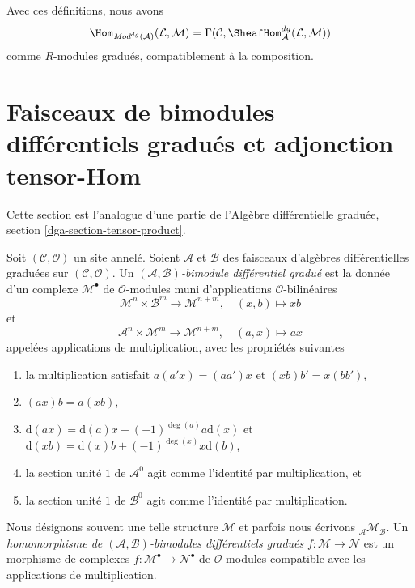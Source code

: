 \medskip\noindent
Avec ces définitions, nous avons
$$
\Hom_{\textit{Mod}^{dg}(\mathcal{A})}(\mathcal{L}, \mathcal{M}) =
\Gamma(\mathcal{C}, \SheafHom^{dg}_\mathcal{A}(\mathcal{L}, \mathcal{M}))
$$
comme $R$-modules gradués, compatiblement à la composition.









\section{Faisceaux de bimodules différentiels gradués et adjonction tensor-Hom}
\label{section-dg-bimodules}

\noindent
Cette section est l'analogue d'une partie de l'Algèbre différentielle graduée, section \ref{dga-section-tensor-product}.

\begin{definition}
\label{definition-dg-bimodule}
Soit $(\mathcal{C}, \mathcal{O})$ un site annelé.
Soient $\mathcal{A}$ et $\mathcal{B}$ des faisceaux d'algèbres différentielles graduées sur $(\mathcal{C}, \mathcal{O})$.
Un {\it $(\mathcal{A}, \mathcal{B})$-bimodule différentiel gradué} est la donnée d'un complexe $\mathcal{M}^\bullet$ de $\mathcal{O}$-modules muni d'applications $\mathcal{O}$-bilinéaires
$$
\mathcal{M}^n \times \mathcal{B}^m \to \mathcal{M}^{n + m},\quad
(x, b) \longmapsto xb
$$
et
$$
\mathcal{A}^n \times \mathcal{M}^m \to \mathcal{M}^{n + m},\quad
(a, x) \longmapsto ax
$$
appelées applications de multiplication, avec les propriétés suivantes
\begin{enumerate}
\item la multiplication satisfait $a(a'x) = (aa')x$ et $(xb)b' = x(bb')$,
\item $(ax)b = a(xb)$,
\item $\text{d}(ax) = \text{d}(a) x + (-1)^{\deg(a)}a \text{d}(x)$ et $\text{d}(xb) = \text{d}(x) b + (-1)^{\deg(x)}x \text{d}(b)$,
\item la section unité $1$ de $\mathcal{A}^0$ agit comme l'identité par multiplication, et
\item la section unité $1$ de $\mathcal{B}^0$ agit comme l'identité par multiplication.
\end{enumerate}
Nous désignons souvent une telle structure $\mathcal{M}$ et parfois nous écrivons ${}_\mathcal{A}\mathcal{M}_\mathcal{B}$.
Un {\it homomorphisme de $(\mathcal{A}, \mathcal{B})$-bimodules différentiels gradués} $f : \mathcal{M} \to \mathcal{N}$ est un morphisme de complexes $f : \mathcal{M}^\bullet \to \mathcal{N}^\bullet$ de $\mathcal{O}$-modules compatible avec les applications de multiplication.
\end{definition}


